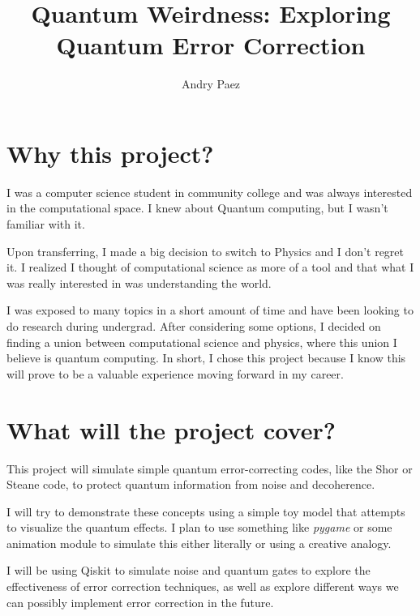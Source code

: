 \documentclass{article}
\begin{document}
\newcommand{\ket}[1]{\left| #1 \right>}

\title{Quantum Weirdness: Exploring Quantum Error Correction}
\author{Andry Paez}
\date{}
\maketitle

\section*{Why this project?} 

I was a computer science student in community college and was always interested in the computational space. I knew about Quantum computing, but I wasn't familiar with it.

Upon transferring, I made a big decision to switch to Physics and I don't regret it. I realized I thought of computational science as more of a tool and that what I was really interested in was understanding the world.

I was exposed to many topics in a short amount of time and have been looking to do research during undergrad. After considering some options, I decided on finding a union between computational science and physics, where this union I believe is quantum computing. In short, I chose this project because I know this will prove to be a valuable experience moving forward in my career.

\section*{What will the project cover?}

\indent This project will simulate simple quantum error-correcting codes, like the Shor or Steane code, to protect quantum information from noise and decoherence. 

I will try to demonstrate these concepts using a simple toy model that attempts to visualize the quantum effects. I plan to use something like \textit{pygame} or some animation module to simulate this either literally or using a creative analogy.

I will be using Qiskit to simulate noise and quantum gates to explore the effectiveness of error correction techniques, as well as explore different ways we can possibly implement error correction in the future.
\end{document}
